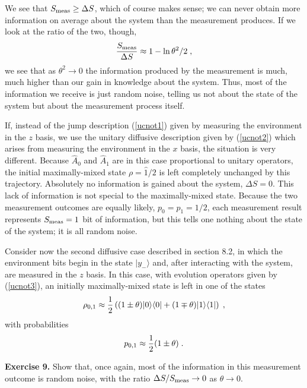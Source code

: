 \documentclass[12pt]{article}
\def\bra#1{{\langle #1 |}}
\def\ket#1{{| #1 \rangle}}
\def\id{{\hat 1}}
\def\A{{\hat A}}
\begin{document}
We see that $S_{\rm meas} \ge \Delta S$, which of course makes sense;
we can never obtain more information on average about the system than
the measurement produces.  If we look at the ratio of the two, though,
\begin{equation}
{ S_{\rm meas} \over \Delta S } \approx 1 - \ln \theta^2/2 \;,
\label{ratio}
\end{equation}
we see that as $\theta^2 \rightarrow 0$ the information produced by the
measurement is much, much higher than our gain in knowledge about the
system.  Thus, most of the information we receive is just random noise,
telling us not about the state of the system but about the measurement
process itself.

If, instead of the jump description (\ref{ucnot1}) given by measuring
the environment in the $z$ basis, we use the unitary diffusive description
given by (\ref{ucnot2}) which arises from measuring the environment in the
$x$ basis, the situation is very different.  Because $\A_0$ and
$\A_1$ are in this case proportional to unitary operators, the initial
maximally-mixed state $\rho = \id/2$ is left completely unchanged by
this trajectory.  Absolutely no information is gained about the system,
$\Delta S = 0$.  This lack of information is not special to the
maximally-mixed state.  Because the two measurement outcomes are equally
likely, $p_0 = p_1 = 1/2$, each measurement result represents
$S_{\rm meas}=1$ bit of information, but this tells one nothing about
the state of the system; it is all random noise.

Consider now the second diffusive case described in section 8.2,
in which the environment bits begin
in the state $\ket{y_-}$ and, after interacting with the system, are
measured in the $z$ basis.  In this case, with evolution operators given
by (\ref{ucnot3}), an initially maximally-mixed state is left in one of
the states
\begin{equation}
\rho_{0,1} \approx {1\over2}\left( (1\pm\theta)\ket0\bra0
  + (1\mp\theta)\ket1\bra1 \right) \;,
\label{less_mixed}
\end{equation}
with probabilities
\begin{equation}
p_{0,1} \approx {1\over2}(1\pm\theta) \;.
\end{equation}

\medskip\noindent
{\bf Exercise 9.}  Show that, once again, most of the information
in this measurement outcome is random noise, with the ratio
$\Delta S/S_{\rm meas} \rightarrow 0$ as $\theta\rightarrow0$.
\medskip
\end{document}

